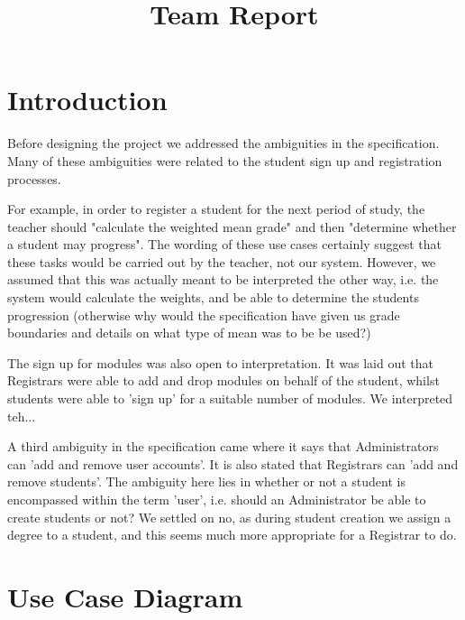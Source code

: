 \documentclass[12pt,a4paper,oneside,draft]{article}
\title{Team Report}
\date{} %
\begin{document}
\maketitle

\section{Introduction}
Before designing the project we addressed the ambiguities in the specification.
Many of these ambiguities were related to the student sign up and registration
processes.

For example, in order to register a student for the next period of study, the
teacher  should "calculate the weighted mean grade" and then "determine
whether a student may progress". The wording of these use cases certainly suggest that
these tasks would be carried out by the teacher, not our system. However, we assumed
that this was actually meant to be interpreted the other way, i.e. the system
would calculate the weights, and be able to determine the students progression
(otherwise why would the specification have given us grade boundaries and details on what
type of mean was to be be used?)

The sign up for modules was also open to interpretation. It was laid out that
Registrars were able to add and drop modules on behalf of the student, whilst
students were able to 'sign up' for a suitable number of modules. We interpreted
teh...

A third ambiguity in the specification came where it says that Administrators can
'add and remove user accounts'. It is also stated that Registrars can 'add and remove
students'. The ambiguity here lies in whether or not a student is encompassed within
 the term 'user', i.e. should an Administrator be able to create students or not? We
  settled on no, as during student creation we assign a degree to a student, and this
   seems much more appropriate for a Registrar to do.




\section{Use Case Diagram}

\end{document}
